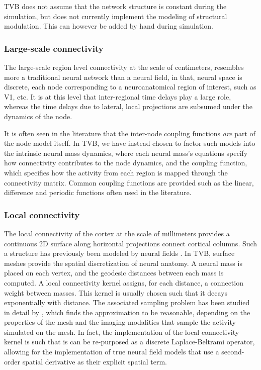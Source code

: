 \documentclass{bioinfo}
\begin{document}
TVB does not assume that the network structure is constant during the
simulation, but does not currently implement the modeling of structural
modulation. This can however be added by hand during simulation.

\subsubsection{Large-scale connectivity}

The large-scale region level connectivity at the scale of centimeters,
resembles more a traditional neural network than a neural field, in that,
neural space is discrete,  each node corresponding to a neuroanatomical
region of interest, such as V1, etc. It is at this level that inter-regional 
time delays play a large role, whereas the time delays due to 
lateral, local projections are subsumed under the dynamics of the node.

It is often seen in the literature that the inter-node coupling functions
\textit{are} part of the node model itself. In TVB, we have instead 
chosen to factor such models into the intrinsic neural mass dynamics, where each 
neural mass's equations specify how connectivity contributes to the
node dynamics, and the coupling function, which specifies how the activity
from each region is mapped through the connectivity matrix. Common coupling 
functions are provided such as the linear, difference and periodic functions
often used in the literature.

\subsubsection{Local connectivity}

The local connectivity of the cortex at the scale of millimeters provides
a continuous 2D surface along horizontal projections connect 
cortical columns. Such a structure has previously been modeled by
neural fields \citep{Amari_1977, Jirsa_1997, Liley_1999}. 
In TVB, surface meshes provide the spatial discretization of neural anatomy. A
neural mass is placed on each vertex, and the geodesic distances between each
mass is computed. A local connectivity kernel assigns, for each distance, a
connection weight between masses. This kernel is usually chosen such that it
decays exponentially with distance.
The associated sampling problem has been studied in detail by \citeauthor{Spiegler_2013},
which finds the approximation to be reasonable, depending on the properties
of the mesh and the imaging modalities that sample the activity simulated
on the mesh. In fact,
the implementation of the local connectivity kernel is such
that is can be re-purposed as a discrete Laplace-Beltrami operator,
allowing for the implementation of true neural field models that 
use a second-order spatial derivative as their explicit spatial term.
\end{document}
